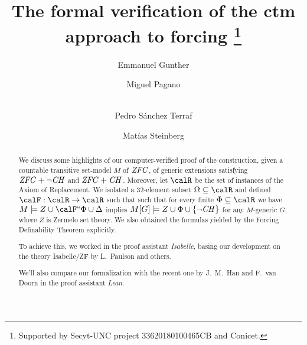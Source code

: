 \documentclass[runningheads]{llncs}
\begin{document}
%
\title{The formal verification of the ctm approach to forcing%
  \thanks{Supported by Secyt-UNC project 33620180100465CB and Conicet.}%
}
%
%
\author{Emmanuel Gunther \and
Miguel Pagano \and \\
Pedro Sánchez Terraf%
\and
Matías Steinberg
}
%
%
%
\maketitle              %
%
\begin{abstract}
  We discuss some highlights of our computer-verified
  proof of the construction, given a countable transitive set-model $M$
  of $\mathit{ZFC}$, of generic extensions  satisfying $\mathit{ZFC}+\neg\mathit{CH}$ and $\mathit{ZFC}+\mathit{CH}$.
  Moreover, let $\calR$ be the set of instances of the Axiom of
  Replacement. We isolated a 32-element subset $\Omega\sbq\calR$ and
  defined $\calF:\calR\to\calR$
  such that such that for every finite $\Phi\sbq\calR$
  we have
  $M\models Z \cup \calF\dimg\Phi \cup \Delta$ implies $M[G]\models Z
  \cup \Phi \cup \{ \neg \mathit{CH} \}$ for any $M$-generic $G$, where $Z$ is
  Zermelo set theory.
  We also obtained the formulas yielded by the Forcing Definability Theorem
  explicitly.

  To achieve this, we worked in the proof assistant \emph{Isabelle},
  basing our development on the theory Isabelle/ZF by L.~Paulson and
  others.


  We'll also compare our formalization with the recent one by J.~M.~Han and F.~van Doorn in the proof assistant \emph{Lean}.

\end{abstract}
%
%
%

 
\end{document}
